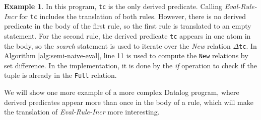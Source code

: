 \documentclass[twoside,11pt]{report}
\theoremstyle{definition}
\newtheorem{exmp}{Example}[chapter]
\begin{document}
\begin{exmp}
  In this program, \texttt{tc} is the only derived predicate. Calling \textit{Eval-Rule-Incr} for \texttt{tc} includes the translation of both rules. However, there is no derived predicate in the body of the first rule, so the first rule is translated to an empty statement. For the second rule, the derived predicate \texttt{tc} appears in one atom in the body, so the \textit{search} statement is used to iterate over the \textit{New} relation $\Delta$\texttt{tc}. In Algorithm \ref{alg:semi-naive-eval}, line 11 is used to compute the \texttt{New} relations by set difference. In the implementation, it is done by the \textit{if} operation to check if the tuple is already in the \texttt{Full} relation.
\end{exmp}
\label{exmp:tc-ram}

We will show one more example of a more complex Datalog program, where derived predicates appear more than once in the body of a rule, which will make the translation of \textit{Eval-Rule-Incr} more interesting.
\end{document}
